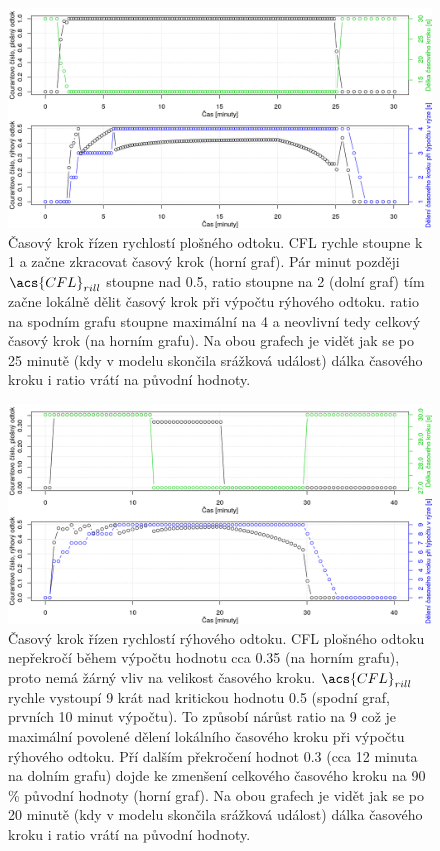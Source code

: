   
  \begin{figure}%
    \centering
    \includegraphics[width=1.0\textwidth]{./img/courantratio.png}
    \caption{Časový krok řízen rychlostí plošného odtoku. \acs{CFL} rychle stoupne k 1 a začne zkracovat časový krok (horní graf). Pár minut později $\acs{CFL}_{rill}$ stoupne nad 0.5, \acs{ratio} stoupne na 2 (dolní graf) tím začne lokálně dělit časový krok při výpočtu rýhového odtoku. \acs{ratio} na spodním grafu stoupne maximální na 4 a neovlivní tedy celkový časový krok (na horním grafu). Na obou grafech je vidět jak se po 25 minutě (kdy v modelu skončila srážková událost) dálka časového kroku i \acs{ratio} vrátí na původní hodnoty.}
    \label{fig:cfl1}
  \end{figure}
  
  
  \begin{figure}%
    \centering
    \includegraphics[width=1.0\textwidth]{./img/courantratio2.png}
    \caption{Časový krok řízen rychlostí rýhového odtoku.  \acs{CFL} plošného odtoku nepřekročí během výpočtu hodnotu cca 0.35 (na horním grafu), proto nemá žárný vliv na velikost časového kroku.  $\acs{CFL}_{rill}$ rychle vystoupí 9 krát nad kritickou hodnotu 0.5 (spodní graf, prvních 10 minut výpočtu). To způsobí nárůst \acs{ratio} na 9 což je maximální povolené dělení lokálního časového kroku při výpočtu rýhového odtoku. Pří dalším překročení hodnot 0.3 (cca 12 minuta na dolním grafu) dojde ke zmenšení celkového časového kroku na 90 \% původní hodnoty (horní graf). Na obou grafech je vidět jak se po 20 minutě (kdy v modelu skončila srážková událost) dálka časového kroku i \acs{ratio} vrátí na původní hodnoty.}
    \label{fig:cfl2}
  \end{figure}
  

